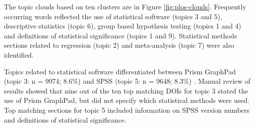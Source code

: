 \documentclass[12pt]{article}
\begin{document}
The topic clouds based on ten clusters are in Figure
\ref{fig:plos-clouds}. Frequently occurring words reflected the use of
statistical software (topics 3 and 5), descriptive statistics (topic 6),
group based hypothesis testing (topics 1 and 4) and definitions of
statistical significance (topics 1 and 9). Statistical methods sections
related to regression (topic 2) and meta-analysis (topic 7) were also
identified.

Topics related to statistical software differentiated between Prism
GraphPad (topic 3: n = 9974; 8.6\%) and SPSS (topic 5: n = 9648; 8.3\%)
. Manual review of results showed that nine out of the ten top matching
DOIs for topic 3 stated the use of Prism GraphPad, but did not specify
which statistical methods were used. Top matching sections for topic 5
included information on SPSS version numbers and definitions of
statistical significance.
\end{document}

